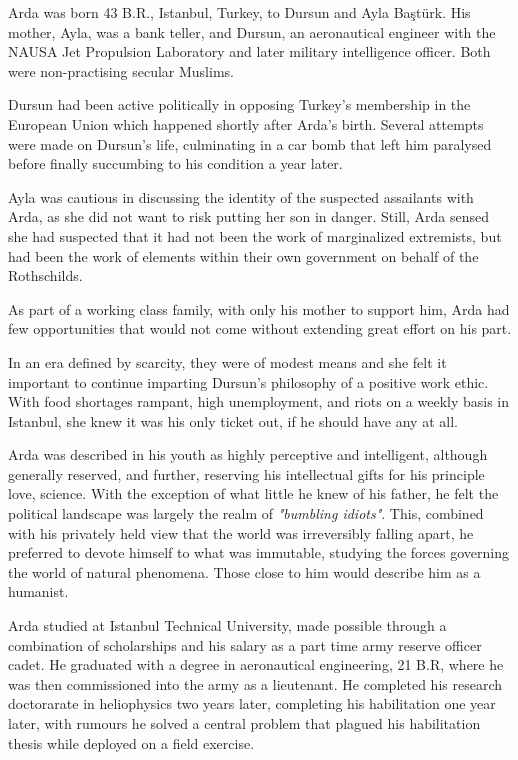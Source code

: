 
Arda was born 43 B.R., Istanbul, Turkey, to Dursun and Ayla Baştürk. His mother, Ayla, was a bank teller, and Dursun, an aeronautical engineer with the NAUSA Jet Propulsion Laboratory and later military intelligence officer. Both were non-practising secular Muslims.

Dursun had been active politically in opposing Turkey's membership in the European Union which happened shortly after Arda's birth. Several attempts were made on Dursun's life, culminating in a car bomb that left him paralysed before finally succumbing to his condition a year later.

Ayla was cautious in discussing the identity of the suspected assailants with Arda, as she did not want to risk putting her son in danger. Still, Arda sensed she had suspected that it had not been the work of marginalized extremists, but had been the work of elements within their own government on behalf of the Rothschilds.

As part of a working class family, with only his mother to support him, Arda had few opportunities that would not come without extending great effort on his part. 

In an era defined by scarcity, they were of modest means and she felt it important to continue imparting Dursun's philosophy of a positive work ethic. With food shortages rampant, high unemployment, and riots on a weekly basis in Istanbul, she knew it was his only ticket out, if he should have any at all.

Arda was described in his youth as highly perceptive and intelligent, although generally reserved, and further, reserving his intellectual gifts for his principle love, science. With the exception of what little he knew of his father, he felt the political landscape was largely the realm of {\it "bumbling idiots"}. This, combined with his privately held view that the world was irreversibly falling apart, he preferred to devote himself to what was immutable, studying the forces governing the world of natural phenomena. Those close to him would describe him as a humanist.

Arda studied at Istanbul Technical University, made possible through a combination of scholarships and his salary as a part time army reserve officer cadet. He graduated with a degree in aeronautical engineering, 21 B.R, where he was then commissioned into the army as a lieutenant. He completed his research doctorarate in heliophysics two years later, completing his habilitation one year later, with rumours he solved a central problem that plagued his habilitation thesis while deployed on a field exercise.

